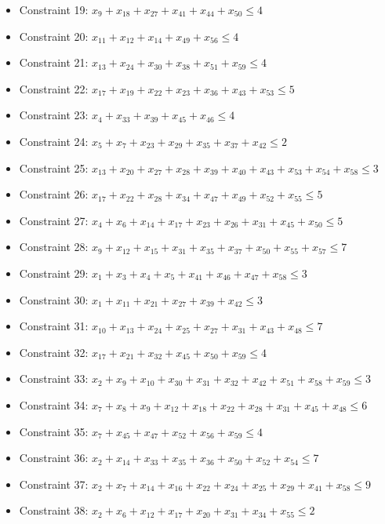 \documentclass[11pt]{article}
\begin{document}
\begin{itemize}
\item Constraint 19: $x_{9} + x_{18} + x_{27} + x_{41} + x_{44} + x_{50} \le 4$
\item Constraint 20: $x_{11} + x_{12} + x_{14} + x_{49} + x_{56} \le 4$
\item Constraint 21: $x_{13} + x_{24} + x_{30} + x_{38} + x_{51} + x_{59} \le 4$
\item Constraint 22: $x_{17} + x_{19} + x_{22} + x_{23} + x_{36} + x_{43} + x_{53} \le 5$
\item Constraint 23: $x_{4} + x_{33} + x_{39} + x_{45} + x_{46} \le 4$
\item Constraint 24: $x_{5} + x_{7} + x_{23} + x_{29} + x_{35} + x_{37} + x_{42} \le 2$
\item Constraint 25: $x_{13} + x_{20} + x_{27} + x_{28} + x_{39} + x_{40} + x_{43} + x_{53} + x_{54} + x_{58} \le 3$
\item Constraint 26: $x_{17} + x_{22} + x_{28} + x_{34} + x_{47} + x_{49} + x_{52} + x_{55} \le 5$
\item Constraint 27: $x_{4} + x_{6} + x_{14} + x_{17} + x_{23} + x_{26} + x_{31} + x_{45} + x_{50} \le 5$
\item Constraint 28: $x_{9} + x_{12} + x_{15} + x_{31} + x_{35} + x_{37} + x_{50} + x_{55} + x_{57} \le 7$
\item Constraint 29: $x_{1} + x_{3} + x_{4} + x_{5} + x_{41} + x_{46} + x_{47} + x_{58} \le 3$
\item Constraint 30: $x_{1} + x_{11} + x_{21} + x_{27} + x_{39} + x_{42} \le 3$
\item Constraint 31: $x_{10} + x_{13} + x_{24} + x_{25} + x_{27} + x_{31} + x_{43} + x_{48} \le 7$
\item Constraint 32: $x_{17} + x_{21} + x_{32} + x_{45} + x_{50} + x_{59} \le 4$
\item Constraint 33: $x_{2} + x_{9} + x_{10} + x_{30} + x_{31} + x_{32} + x_{42} + x_{51} + x_{58} + x_{59} \le 3$
\item Constraint 34: $x_{7} + x_{8} + x_{9} + x_{12} + x_{18} + x_{22} + x_{28} + x_{31} + x_{45} + x_{48} \le 6$
\item Constraint 35: $x_{7} + x_{45} + x_{47} + x_{52} + x_{56} + x_{59} \le 4$
\item Constraint 36: $x_{2} + x_{14} + x_{33} + x_{35} + x_{36} + x_{50} + x_{52} + x_{54} \le 7$
\item Constraint 37: $x_{2} + x_{7} + x_{14} + x_{16} + x_{22} + x_{24} + x_{25} + x_{29} + x_{41} + x_{58} \le 9$
\item Constraint 38: $x_{2} + x_{6} + x_{12} + x_{17} + x_{20} + x_{31} + x_{34} + x_{55} \le 2$

\end{itemize}
\end{document}
